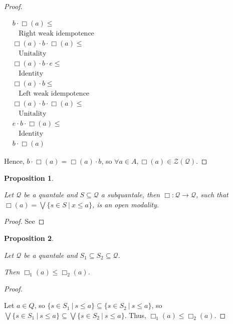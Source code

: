 \documentclass[a4paper]{article}
\newtheorem{prop}{Proposition}
\begin{document}
\begin{proof}
$ $

  $\begin{array}{lll}
  & b \cdot \Box(a) \leq & \\
  & \:\:\:\: \text{Right weak idempotence}& \\
  &\Box(a) \cdot b \cdot \Box(a) \leq & \\
  & \:\:\:\: \text{Unitality}& \\
  & \Box(a) \cdot b \cdot e \leq & \\
  & \:\:\:\: \text{Identity}& \\
  &\Box(a) \cdot b \leq & \\
  & \:\:\:\: \text{Left weak idempotence}& \\
  &\Box(a) \cdot b \cdot \Box(a) \leq & \\
  & \:\:\:\: \text{Unitality}& \\
  &e \cdot b \cdot \Box(a) \leq & \\
  & \:\:\:\: \text{Identity}& \\
  &b \cdot \Box(a)&
  \end{array}$

Hence, $b \cdot \Box(a) = \Box(a) \cdot b$, so $\forall a \in A, \Box(a) \in \mathcal{Z}(\mathcal{Q})$.

\end{proof}

\begin{prop}
$ $

  Let $\mathcal{Q}$ be a quantale and $S \subseteq \mathcal{Q}$ a subquantale, then $\Box : \mathcal{Q} \to \mathcal{Q}$, such that
$\Box(a) = \bigvee \{ s \in S \: | \: x \leq a \}$, is an open modality.
\end{prop}

\begin{proof}
  See
\end{proof}

\begin{prop}
$ $

  Let $\mathcal{Q}$ be a quantale and $S_1 \subseteq S_2 \subseteq \mathcal{Q}$.

  Then $\Box_1 (a) \leq \Box_2 (a)$.
\end{prop}

\begin{proof}
$ $

  Let $a \in Q$, so $\{ s \in S_1 \: | \: s \leq a \} \subseteq \{ s \in S_2 \: | \: s \leq a \}$, so
  $\bigvee \{ s \in S_1 \: | \: s \leq a \} \subseteq \bigvee \{ s \in S_2 \: | \: s \leq a \}$.
  Thus, $\Box_1 (a) \leq \Box_2 (a)$.
\end{proof}
\end{document}
